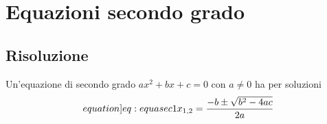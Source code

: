 \chapter{Equazioni secondo grado}\label{ch:equazioni-secondo-grado}
\section{Risoluzione}\label{sec:risoluzione}
\begin{thm}\label{thm:Equasec1}
	Un'equazione di secondo grado $ax^2+bx+c=0$ con $a\neq 0$ ha per soluzioni \begin{equation*}\label[equation]{eq:equasec1}
	x_{1,2}=\dfrac{-b\pm\sqrt{b^2-4ac}}{2a}
	\end{equation*}
\end{thm}


